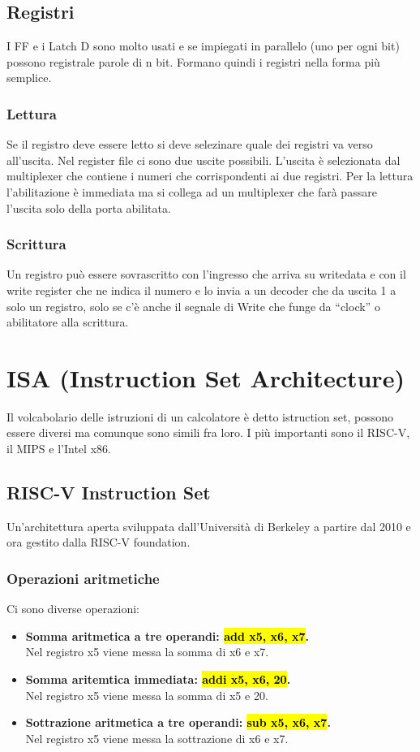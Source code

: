 \documentclass{article}
\begin{document}
\subsection{Registri}
I FF e i Latch D sono molto usati e se impiegati in parallelo (uno per ogni bit) possono registrale parole di n bit. Formano quindi i registri nella forma più semplice.

\subsubsection{Lettura}
Se il registro deve essere letto si deve selezinare quale dei registri va verso all’uscita. Nel register file ci sono due uscite possibili. L’uscita è selezionata dal multiplexer che contiene i numeri che corrispondenti ai due registri. Per la lettura l’abilitazione è immediata ma si collega ad un multiplexer che farà passare l’uscita solo della porta abilitata.

\subsubsection{Scrittura}
Un registro può essere sovrascritto con l’ingresso che arriva su writedata e con il write register che ne indica il numero e lo invia a un decoder che da uscita 1 a solo un registro, solo se c’è anche il segnale di Write che funge da “clock” o abilitatore alla scrittura.



\newpage
\section{ISA (Instruction Set Architecture)}
Il volcabolario delle istruzioni di un calcolatore è detto istruction set, possono essere diversi ma comunque sono simili fra loro. 
I più importanti sono il RISC-V, il MIPS e l'Intel x86.

\subsection{RISC-V Instruction Set}
Un’architettura aperta sviluppata dall’Università di
Berkeley a partire dal 2010 e ora gestito dalla RISC-V foundation.

\subsubsection{Operazioni aritmetiche}
Ci sono diverse operazioni:
\begin{itemize}
    \item \textbf{Somma aritmetica a tre operandi: \hl{add x5, x6, x7}.}
    \\Nel registro x5 viene messa la somma di x6 e x7.
    \item \textbf{Somma aritemtica immediata: \hl{addi x5, x6, 20}.}
    \\Nel registro x5 viene messa la somma di x5 e 20.
    \item \textbf{Sottrazione aritmetica a tre operandi: \hl{sub x5, x6, x7}.}
    \\Nel registro x5 viene messa la sottrazione di x6 e x7.
\end{itemize}
\end{document}
